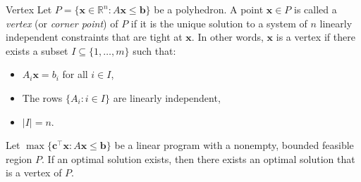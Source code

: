\begin{definition}{Vertex}{}{}
Let \( P = \{ \mathbf{x} \in \mathbb{R}^n : A \mathbf{x} \leq \mathbf{b} \} \) be a polyhedron.  
A point \( \mathbf{x} \in P \) is called a \emph{vertex} (or \emph{corner point}) of \( P \) if it is the unique solution to a system of \( n \) linearly independent constraints that are tight at \( \mathbf{x} \).  
In other words, \( \mathbf{x} \) is a vertex if there exists a subset \( I \subseteq \{1, \dots, m\} \) such that:
\begin{itemize}
  \item \( A_i \mathbf{x} = b_i \) for all \( i \in I \),
  \item The rows \( \{ A_i : i \in I \} \) are linearly independent,
  \item \( |I| = n \).
\end{itemize}
\end{definition}

\begin{theorem}{}{}{}
Let \( \max \{ \mathbf{c}^\top \mathbf{x} : A \mathbf{x} \leq \mathbf{b} \} \) be a linear program with a nonempty, bounded feasible region \( P \).  
If an optimal solution exists, then there exists an optimal solution that is a vertex of \( P \).
\end{theorem}

